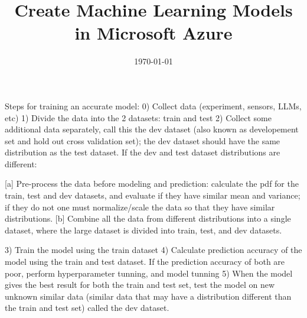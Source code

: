 \documentclass[11pt, onecolumn]{article}
\title{Create Machine Learning Models in Microsoft Azure}	%
\date{\today}	%
\begin{document}

\maketitle		%

\thispagestyle{empty}	%




\newpage				%

\tableofcontents		%

\newpage				%




Steps for training an accurate model:
0) Collect data (experiment, sensors, LLMs, etc)
1) Divide the data into the 2 datasets: train and test
2) Collect some additional data separately, call this the dev dataset (also known as developement set and hold out cross validation set); the dev dataset should have the same distribution as the test dataset. If the dev and test dataset distributions are different:

[a] Pre-process the data before modeling and prediction: calculate the pdf for the train, test and dev datasets, and evaluate if they have similar mean and variance; if they do not one must normalize/scale the data so that they have similar distributions. 
[b] Combine all the data from different distributions into a single dataset, where the large dataset is divided into train, test, and dev datasets.
  
3) Train the model using the train dataset
4) Calculate prediction accuracy of the model using the train and test dataset. If the prediction accuracy of both are poor, perform hyperparameter tunning, and model tunning
5) When the model gives the best result for both the train and test set, test the model on new unknown similar data (similar data that may have a distribution different than the train and test set) called the dev dataset.  
\end{document}
